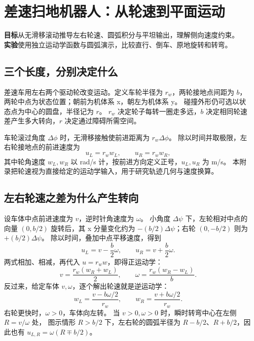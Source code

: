 \chapter{差速扫地机器人：从轮速到平面运动}
\begin{notebox}
\textbf{目标}\quad 从无滑移滚动推导左右轮速、圆弧积分与平坦输出，理解侧向速度约束。\\
\textbf{实验}\quad 使用独立运动学函数与圆弧演示，比较直行、倒车、原地旋转和转弯。
\end{notebox}
\section{三个长度，分别决定什么}
差速车用左右两个驱动轮改变运动。定义车轮半径为 $r_w$，两轮接地点间距为 $b$，
两轮中点为状态位置；朝前为机体系 x，朝左为机体系 y。
碰撞外形仍可选以状态点为中心的圆盘，半径记为 $r$。
$r_w$ 决定轮子每转一圈走多远，$b$ 决定相同轮速差产生多大转向，$r$ 决定通过障碍所需空间。

车轮滚过角度 $\Delta\phi$ 时，无滑移接触使前进距离为 $r_w\Delta\phi$。
除以时间并取极限，左右轮接地点的前进速度为
\[
 u_L=r_w w_L,\qquad u_R=r_w w_R,
\]
其中轮角速度 $w_L,w_R$ 以 rad/s 计，按前进方向定义正号，$u_L,u_R$ 为 m/s。
本附录把轮速视为直接给定的运动学输入，用于研究轨迹几何与速度换算。

\section{左右轮速之差为什么产生转向}
设车体中点前进速度为 $v$，逆时针角速度为 $\omega$。
小角度 $\Delta\psi$ 下，左轮相对中点的向量 $(0,b/2)$ 旋转后，其 x 分量变化约为
$-(b/2)\Delta\psi$；右轮 $(0,-b/2)$ 则为 $+(b/2)\Delta\psi$。
除以时间，叠加中点平移速度，得到
\[
 u_L=v-\frac b2\omega,\qquad u_R=v+\frac b2\omega.
\]
两式相加、相减，再代入 $u=r_ww$，即得正运动学：
\begin{equation}
 v=\frac{r_w(w_R+w_L)}2,\qquad
 \omega=\frac{r_w(w_R-w_L)}b.
 \label{eq:diff_forward}
\end{equation}
反过来，给定车体 $v,\omega$，逐个解出轮速就是逆运动学：
\begin{equation}
 w_L=\frac{v-b\omega/2}{r_w},\qquad
 w_R=\frac{v+b\omega/2}{r_w}.
 \label{eq:diff_inverse}
\end{equation}
右轮更快时，$\omega>0$，车体向左转。
当 $v>0,\omega>0$ 时，瞬时转弯中心在左侧 $R=v/\omega$ 处，
图示情形 $R>b/2$ 下，左右轮的圆弧半径为 $R-b/2$、$R+b/2$，因此也有 $u_{L,R}=\omega(R\mp b/2)$。

